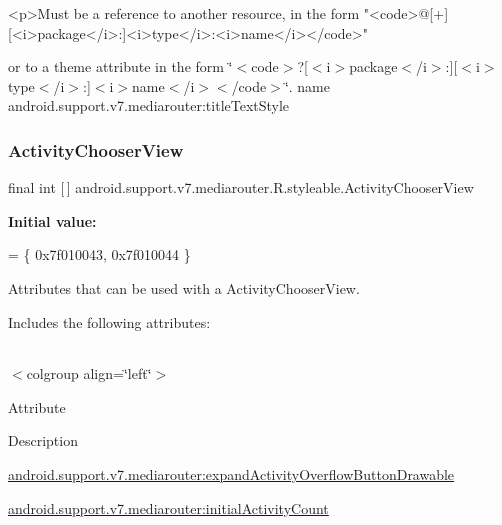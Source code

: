 \begin{DoxyVerb}      <p>Must be a reference to another resource, in the form "<code>@[+][<i>package</i>:]<i>type</i>:<i>name</i></code>"
\end{DoxyVerb}
 or to a theme attribute in the form \char`\"{}$<$code$>$?\mbox{[}$<$i$>$package$<$/i$>$\+:\mbox{]}\mbox{[}$<$i$>$type$<$/i$>$\+:\mbox{]}$<$i$>$name$<$/i$>$$<$/code$>$\char`\"{}.  name android.\+support.\+v7.\+mediarouter\+:title\+Text\+Style \mbox{\label{classandroid_1_1support_1_1v7_1_1mediarouter_1_1R_1_1styleable_a053ff33215816ca018afd657dbf094a2}} 
\subsubsection{\texorpdfstring{Activity\+Chooser\+View}{ActivityChooserView}}
{\footnotesize\ttfamily final int \mbox{[}$\,$\mbox{]} android.\+support.\+v7.\+mediarouter.\+R.\+styleable.\+Activity\+Chooser\+View\hspace{0.3cm}{\ttfamily [static]}}

{\bfseries Initial value\+:}
\begin{DoxyCode}
= \{
            0x7f010043, 0x7f010044
        \}
\end{DoxyCode}
Attributes that can be used with a Activity\+Chooser\+View. 

Includes the following attributes\+:

\tabulinesep=1mm
\begin{longtabu} spread 0pt [c]{*{0}{|X[-1]}|}
\hline
\end{longtabu}
$<$colgroup align=\char`\"{}left\char`\"{}$>$ 

Attribute

Description 

{\ttfamily \hyperlink{classandroid_1_1support_1_1v7_1_1mediarouter_1_1R_1_1styleable_a457330a114518bf1b63afb5c8d5d4ba4}{android.\+support.\+v7.\+mediarouter\+:expand\+Activity\+Overflow\+Button\+Drawable}}

{\ttfamily \hyperlink{classandroid_1_1support_1_1v7_1_1mediarouter_1_1R_1_1styleable_a85994d46283b79caf8459fb6bee0dc0e}{android.\+support.\+v7.\+mediarouter\+:initial\+Activity\+Count}}

